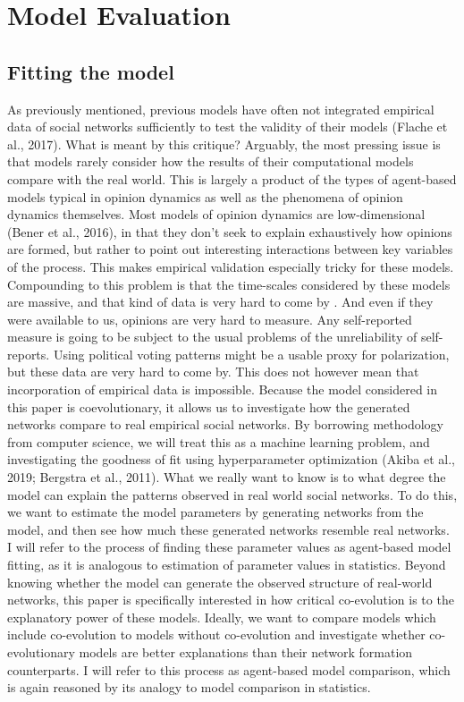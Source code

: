 \documentclass{article}
\begin{document}
\section{Model Evaluation}

\subsection{Fitting the model}
As previously mentioned, previous models have often not integrated empirical data of social networks sufficiently to test the validity of their models (Flache et al., 2017). What is meant by this critique? Arguably, the most pressing issue is that models rarely consider how the results of their computational models compare with the real world. This is largely a product of the types of agent-based models typical in opinion dynamics as well as the phenomena of opinion dynamics themselves. Most models of opinion dynamics are low-dimensional (Bener et al., 2016), in that they don’t seek to explain exhaustively how opinions are formed, but rather to point out interesting interactions between key variables of the process. This makes empirical validation especially tricky for these models. Compounding to this problem is that the time-scales considered by these models are massive, and that kind of data is very hard to come by \cite{mas2019challenges}. And even if they were available to us, opinions are very hard to measure. Any self-reported measure is going to be subject to the usual problems of the unreliability of self-reports. Using political voting patterns might be a usable proxy for polarization, but these data are very hard to come by. 
This does not however mean that incorporation of empirical data is impossible. Because the model considered in this paper is coevolutionary, it allows us to investigate how the generated networks compare to real empirical social networks. By borrowing methodology from computer science, we will treat this as a machine learning problem, and investigating the goodness of fit using hyperparameter optimization (Akiba et al., 2019; Bergstra et al., 2011). What we really want to know is to what degree the model can explain the patterns observed in real world social networks. To do this, we want to estimate the model parameters by generating networks from the model, and then see how much these generated networks resemble real networks. I will refer to the process of finding these parameter values as agent-based model fitting, as it is analogous to estimation of parameter values in statistics. Beyond knowing whether the model can generate the observed structure of real-world networks, this paper is specifically interested in how critical co-evolution is to the explanatory power of these models. Ideally, we want to compare models which include co-evolution to models without co-evolution and investigate whether co-evolutionary models are better explanations than their network formation counterparts. I will refer to this process as agent-based model comparison, which is again reasoned by its analogy to model comparison in statistics. 
\end{document}
